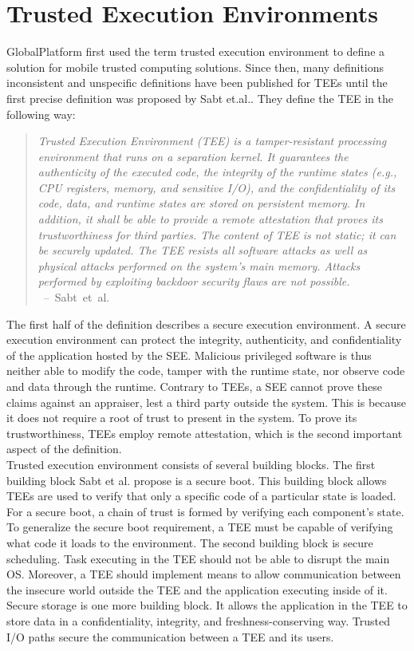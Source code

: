 \section{Trusted Execution Environments}
\label{sec:state:tee}

GlobalPlatform first used the term trusted execution environment to define a
solution for mobile trusted computing solutions.\cite{globaltee} Since then,
many definitions inconsistent and unspecific definitions have been published for
TEEs until the first precise definition was proposed by Sabt
et.al.\cite{sabt2015trusted}. They define the TEE in the following way:
\begin{quote}
    \textit{Trusted Execution Environment (TEE) is a tamper-resistant processing
        environment that runs on a separation kernel. It guarantees the authenticity of
        the executed code, the integrity of the runtime states (e.g., CPU registers,
        memory, and sensitive I/O), and the confidentiality of its code, data, and
        runtime states are stored on persistent memory. In addition, it shall be able
        to provide a remote attestation that proves its trustworthiness for third
        parties. The content of TEE is not static; it can be securely updated. The TEE
        resists all software attacks as well as physical attacks performed on the
        system's main memory. Attacks performed by exploiting backdoor security flaws
        are not possible. \\
    } \mbox{ -- Sabt et al.\cite{sabt2015trusted}}
\end{quote}

The first half of the definition describes a secure execution environment. A
secure execution environment can protect the integrity, authenticity, and
confidentiality of the application hosted by the SEE. Malicious privileged
software is thus neither able to modify the code, tamper with the runtime state,
nor observe code and data through the runtime. Contrary to TEEs, a SEE cannot
prove these claims against an appraiser, lest a third party outside the system.
This is because it does not require a root of trust to present in the system. To
prove its trustworthiness, TEEs employ remote attestation, which is the second
important aspect of the definition.\\

Trusted execution environment consists of several building blocks. The first
building block Sabt et al. propose is a secure boot. This building block allows
TEEs are used to verify that only a specific code of a particular state is
loaded. For a secure boot, a chain of trust is formed by verifying each
component's state. To generalize the secure boot requirement, a TEE must be
capable of verifying what code it loads to the environment. The second building
block is secure scheduling. Task executing in the TEE should not be able to
disrupt the main OS. Moreover, a TEE should implement means to allow
communication between the insecure world outside the TEE and the application
executing inside of it. Secure storage is one more building block. It allows the
application in the TEE to store data in a confidentiality, integrity, and
freshness-conserving way. Trusted I/O paths secure the communication between a
TEE and its users.

